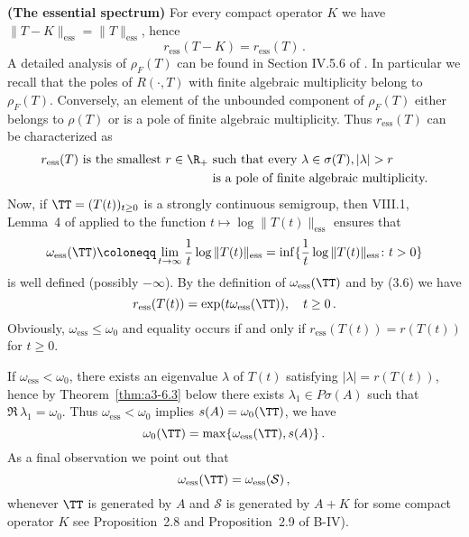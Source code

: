 \begin{example}{\textbf{(The essential spectrum)}}
For every compact operator $K$ we have $\|T - K\|_{\text{ess}} = \|T\|_{\text{ess}}$, hence
\begin{equation}\label{eq:a3-3.7}
r_{\text{ess}}(T - K) = r_{\text{ess}}(T)\,.
\end{equation}
A detailed analysis of $\rho_{F}(T)$ can be found in Section IV.5.6 of \citet{kato:1966}.
In particular we recall that the poles of $R(\cdot,T)$ with finite algebraic multiplicity belong to $\rho_{F}(T)$.
Conversely, an element of the unbounded component of $\rho_{F}(T)$ either belongs to $\rho(T)$ or is a pole of finite algebraic multiplicity.
Thus $r_{\text{ess}}(T)$ can be characterized as
\begin{equation}\label{eq:a3-3.8}
\begin{split}
r_{\text{ess}}(T) \text{ is the smallest } r \in \R_{+}
& \text{ such that every } \lambda \in \sigma(T), |\lambda| > r \\
& \text{ is a pole of finite algebraic multiplicity.}
\end{split}
\end{equation}
Now, if $\TT = (T(t))_{t \geq 0}$ is a strongly continuous semigroup, then VIII.1, Lemma~4 of \citet{dunfordschwartz:1958} applied to the function $t \mapsto \log \|T(t)\|_{\text{ess}}$ ensures that
\begin{equation}\label{eq:a3-3.9}
\omega_{\text{ess}}(\TT) \coloneqq \lim_{t \to \infty} \frac{1}{t} \log\|T(t)\|_{\text{ess}} = \inf \{\frac{1}{t} \log\|T(t)\|_{\text{ess}} \colon t > 0\}
\end{equation}
is well defined (possibly $-\infty$).
By the definition of $\omega_{\text{ess}}(\TT)$ and by (3.6) we have
\begin{equation}\label{eq:a3-3.10}
r_{\text{ess}}(T(t)) = \exp(t\omega_{\text{ess}}(\TT)), \quad t \geq 0\,.
\end{equation}
Obviously, $\omega_{\text{ess}} \leq \omega_{0}$ and equality occurs if and only if $r_{\text{ess}}(T(t)) = r(T(t))$ for $t \geq 0$.

If $\omega_{\text{ess}} < \omega_{0}$, there exists an eigenvalue $\lambda$ of $T(t)$ satisfying $|\lambda| = r(T(t))$, hence by Theorem~\ref{thm:a3-6.3} below there exists $\lambda_{1} \in P\sigma(A)$ such that $\Re\,\lambda_{1} = \omega_{0}$.
Thus $\omega_{\text{ess}} < \omega_{0}$ implies $s(A) = \omega_{0}(\TT)$, \ie we have
\begin{equation}\label{eq:a3-3.11}
\omega_{0}(\TT) = \max\{\omega_{\text{ess}}(\TT),s(A)\}\,.
\end{equation}
As a final observation we point out that
\begin{equation}\label{eq:a3-3.12}
\omega_{\text{ess}}(\TT) = \omega_{\text{ess}}({\mathcal{S}})\,,
\end{equation}
whenever $\TT$ is generated by $A$ and $\mathcal{S}$ is generated by $A + K$ for some compact operator $K$ 
see Proposition~2.8  and Proposition~2.9 of B-IV).
\end{example}

